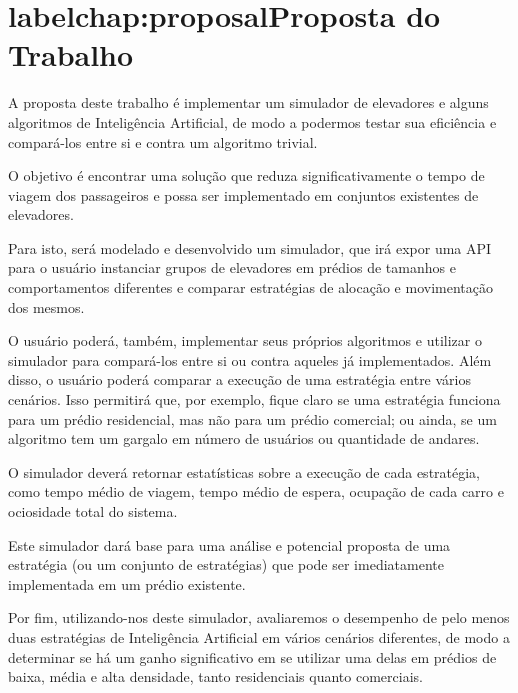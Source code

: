 \chapter{label{chap:proposal}Proposta do Trabalho}

A proposta deste trabalho é implementar um simulador de elevadores e alguns
algoritmos de Inteligência Artificial, de modo a podermos testar sua eficiência
e compará-los entre si e contra um algoritmo trivial.

O objetivo é encontrar uma solução que reduza significativamente o tempo de
viagem dos passageiros e possa ser implementado em conjuntos existentes de
elevadores.

Para isto, será modelado e desenvolvido um simulador, que irá expor uma API para
o usuário instanciar grupos de elevadores em prédios de tamanhos e
comportamentos diferentes e comparar estratégias de alocação e movimentação dos
mesmos.

O usuário poderá, também, implementar seus próprios algoritmos e utilizar o
simulador para compará-los entre si ou contra aqueles já implementados. Além
disso, o usuário poderá comparar a execução de uma estratégia entre vários
cenários. Isso permitirá que, por exemplo, fique claro se uma estratégia
funciona para um prédio residencial, mas não para um prédio comercial; ou ainda,
se um algoritmo tem um gargalo em número de usuários ou quantidade de andares.

O simulador deverá retornar estatísticas sobre a execução de cada estratégia,
como tempo médio de viagem, tempo médio de espera, ocupação de cada carro e
ociosidade total do sistema.

Este simulador dará base para uma análise e potencial proposta de uma estratégia
(ou um conjunto de estratégias) que pode ser imediatamente implementada em um
prédio existente.

Por fim, utilizando-nos deste simulador, avaliaremos o desempenho de pelo menos
duas estratégias de Inteligência Artificial em vários cenários diferentes, de
modo a determinar se há um ganho significativo em se utilizar uma delas em
prédios de baixa, média e alta densidade, tanto residenciais quanto comerciais.
